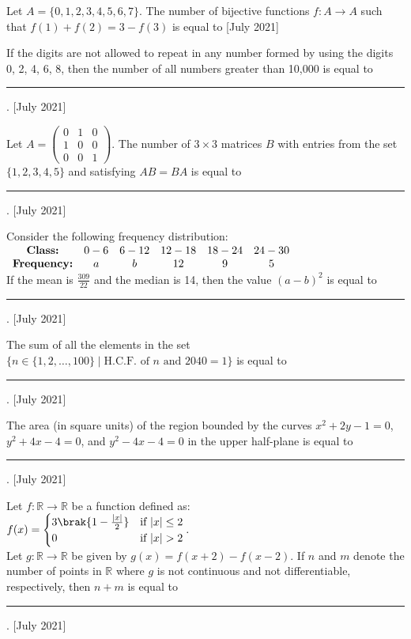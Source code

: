  \iffalse
 \title{July 2021}
 \author{AI24BTECH11012}
 \section{integer}
 \fi
 \item Let $ A = \{0, 1, 2, 3, 4, 5, 6, 7\} $. The number of bijective functions $ f : A \to A $ such that $ f(1) + f(2) = 3 - f(3) $ is equal to
 \hfill{[July 2021]}

    \item If the digits are not allowed to repeat in any number formed by using the digits 0, 2, 4, 6, 8, then the number of all numbers greater than 10,000 is equal to \rule{2.5cm}{0.4pt}.
    \hfill{[July 2021]}

    \item Let $A = 
    \begin{pmatrix}
    0 & 1 & 0 \\
    1 & 0 & 0 \\
    0 & 0 & 1
    \end{pmatrix}.
    $
    The number of $ 3 \times 3 $ matrices $ B $ with entries from the set $ \{1, 2, 3, 4, 5\} $ and satisfying $ AB = BA $ is equal to \rule{2.5cm}{0.4pt}.
    \hfill{[July 2021]}

    \item Consider the following frequency distribution:\\
    $ \begin{array}{c c c c c c c}
\text{\textbf{Class:}} & 0-6 & 6-12 & 12-18 & 18-24 & 24-30 \\
\text{\textbf{Frequency:}} & a & b & 12 & 9 & 5
\end{array}$\\
    If the mean is $ \frac{309}{22} $ and the median is 14, then the value $ (a - b)^2 $ is equal to \rule{2.5cm}{0.4pt}.
    \hfill{[July 2021]}

    \item The sum of all the elements in the set $ \{n \in \{1, 2, \ldots, 100\} \mid \text{H.C.F. of } n \text{ and } 2040 = 1 \} $ is equal to \rule{2.5cm}{0.4pt}.
\hfill{[July 2021]}
    \item The area (in square units) of the region bounded by the curves $ x^2 + 2y - 1 = 0 $, $ y^2 + 4x - 4 = 0 $, and $ y^2 - 4x - 4 = 0 $ in the upper half-plane is equal to \rule{2.5cm}{0.4pt}.
    \hfill{[July 2021]}

    \item Let $ f : \mathbb{R} \to \mathbb{R} $ be a function defined as:\\
    $
    f(x) =
    \begin{cases}
    3\brak{1-\frac{|x|}{2}} & \text{if } |x| \leq 2 \\
    0 & \text{if } |x| > 2
    \end{cases}.
    $\\
    Let $ g : \mathbb{R} \to \mathbb{R} $ be given by $ g(x) = f(x+2) - f(x-2) $. If $ n $ and $ m $ denote the number of points in $ \mathbb{R} $ where $ g $ is not continuous and not differentiable, respectively, then $ n + m $ is equal to \rule{2.5cm}{0.4pt}.
    \hfill{[July 2021]}

